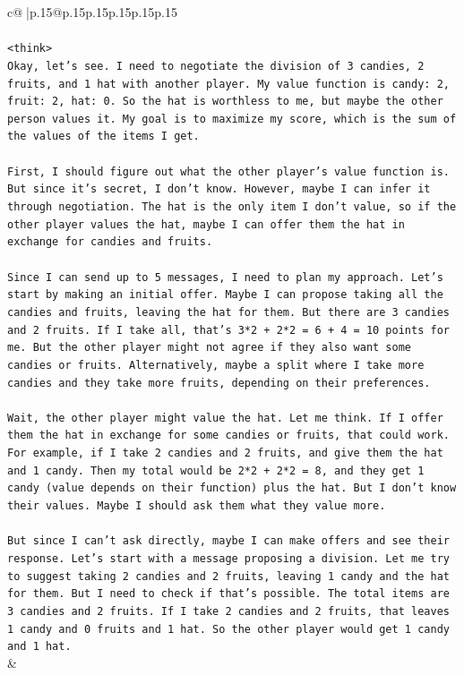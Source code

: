 \documentclass{article}
\begin{document}
{\begin{supertabular}{c@{$\;$}|p{.15\linewidth}@{}p{.15\linewidth}p{.15\linewidth}p{.15\linewidth}p{.15\linewidth}p{.15\linewidth}}
{{{\\ 
\\ 
\texttt{<think>} \\
\texttt{Okay, let's see. I need to negotiate the division of 3 candies, 2 fruits, and 1 hat with another player. My value function is candy: 2, fruit: 2, hat: 0. So the hat is worthless to me, but maybe the other person values it. My goal is to maximize my score, which is the sum of the values of the items I get.} \\
\\ 
\texttt{First, I should figure out what the other player's value function is. But since it's secret, I don't know. However, maybe I can infer it through negotiation. The hat is the only item I don't value, so if the other player values the hat, maybe I can offer them the hat in exchange for candies and fruits.} \\
\\ 
\texttt{Since I can send up to 5 messages, I need to plan my approach. Let's start by making an initial offer. Maybe I can propose taking all the candies and fruits, leaving the hat for them. But there are 3 candies and 2 fruits. If I take all, that's 3*2 + 2*2 = 6 + 4 = 10 points for me. But the other player might not agree if they also want some candies or fruits. Alternatively, maybe a split where I take more candies and they take more fruits, depending on their preferences.} \\
\\ 
\texttt{Wait, the other player might value the hat. Let me think. If I offer them the hat in exchange for some candies or fruits, that could work. For example, if I take 2 candies and 2 fruits, and give them the hat and 1 candy. Then my total would be 2*2 + 2*2 = 8, and they get 1 candy (value depends on their function) plus the hat. But I don't know their values. Maybe I should ask them what they value more.} \\
\\ 
\texttt{But since I can't ask directly, maybe I can make offers and see their response. Let's start with a message proposing a division. Let me try to suggest taking 2 candies and 2 fruits, leaving 1 candy and the hat for them. But I need to check if that's possible. The total items are 3 candies and 2 fruits. If I take 2 candies and 2 fruits, that leaves 1 candy and 0 fruits and 1 hat. So the other player would get 1 candy and 1 hat.} \\
            }
        }
    }
    & \\ \\


\end{supertabular}}
\end{document}
